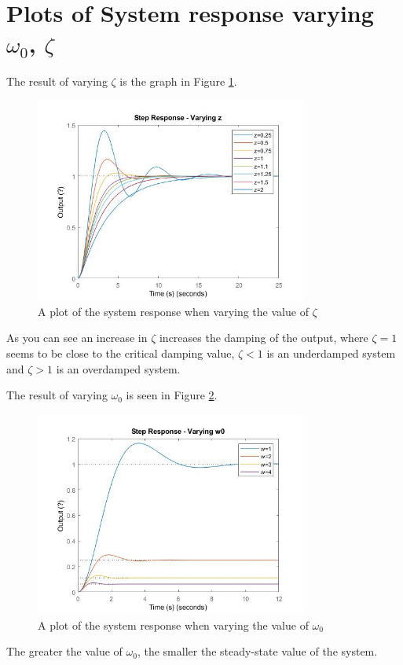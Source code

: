 
\section{Plots of System response varying $\omega_{0}$, $\zeta$}
The result of varying $\zeta$ is the graph in Figure \ref{fig:varying-zeta}.
\begin{figure}[H]
	\centering
	\includegraphics[width=0.8\textwidth]{./figures/lab4_fig1-part4-3-1-z.jpg}
	\caption{A plot of the system response when varying the value of $\zeta$}
	\label{fig:varying-zeta}
\end{figure}
As you can see an increase in $\zeta$ increases the damping of the output, where $\zeta=1$ seems to be close to the critical damping value, $\zeta < 1$ is an underdamped system and $\zeta > 1$ is an overdamped system. 

The result of varying $\omega_{0}$ is seen in Figure \ref{fig:varying-w0}.
\begin{figure}[H]
	\centering
	\includegraphics[width=0.8\textwidth]{./figures/lab4_fig2-part4-3-1-w0.jpg}
	\caption{A plot of the system response when varying the value of $\omega _{0}$}
	\label{fig:varying-w0}
\end{figure}
The greater the value of $\omega_{0}$, the smaller the steady-state value of the system. 

